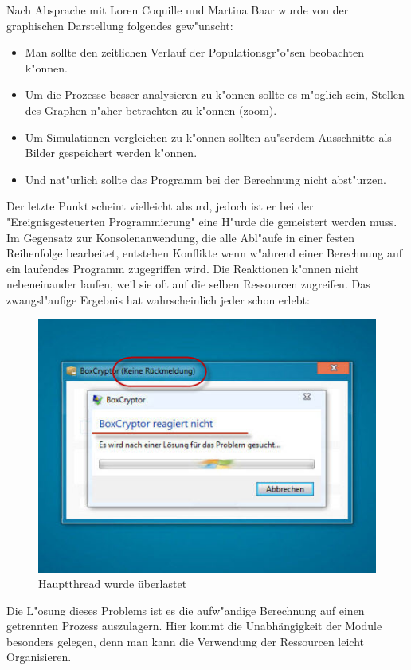 \documentclass[11pt, a4paper, german]{article}
\theoremstyle{plain}
\begin{document}
	Nach Absprache mit Loren Coquille und Martina Baar wurde von der graphischen Darstellung folgendes gew"unscht:\\
	\begin{itemize}
		\item Man sollte den zeitlichen Verlauf der Populationsgr"o"sen beobachten k"onnen.
		\item Um die Prozesse besser analysieren zu k"onnen sollte es m"oglich sein, Stellen des Graphen n"aher betrachten zu k"onnen (zoom).
		\item Um Simulationen vergleichen zu k"onnen sollten au"serdem Ausschnitte als Bilder gespeichert werden k"onnen.
		\item Und nat"urlich sollte das Programm bei der Berechnung nicht abst"urzen.
	\end{itemize}
	Der letzte Punkt scheint vielleicht absurd, jedoch ist er bei der "{}Ereignisgesteuerten Programmierung"{} eine H"urde die gemeistert werden muss.\\
	Im Gegensatz zur Konsolenanwendung, die alle Abl"aufe in einer festen Reihenfolge bearbeitet, entstehen Konflikte wenn w"ahrend einer Berechnung auf ein laufendes Programm zugegriffen wird. Die Reaktionen k"onnen nicht nebeneinander laufen, weil sie oft auf die selben Ressourcen zugreifen. Das zwangsl"aufige Ergebnis hat wahrscheinlich jeder schon erlebt:
	\begin{figure}[H]
		\centering
		\includegraphics[width=0.7\linewidth]{./Pictures/KeineRueckmeldung}
		\caption[Keine Rueckmeldung]{Hauptthread wurde überlastet}
		\label{Keine Rueckmeldung}
	\end{figure}
	Die L"osung dieses Problems ist es die aufw"andige Berechnung auf einen getrennten Prozess auszulagern. Hier kommt die Unabhängigkeit der Module besonders gelegen, denn man kann die Verwendung der Ressourcen leicht Organisieren.\\
\end{document}
